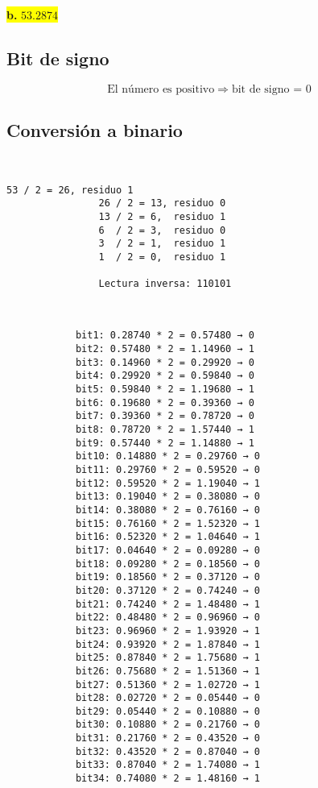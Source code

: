 \documentclass[a4paper,12pt]{article}
\begin{document}
	\begin{center}	
		\colorbox{yellow}{{\textbf{b.} $53.2874$}}
		
		\subsection*{Bit de signo}
		
		\[
		\text{El número es positivo} \Rightarrow \text{bit de signo = } \boxed{0}
		\]
		
		\subsection*{Conversión a binario}
				~~~~~~~
		\begin{center}
			\begin{Verbatim}[formatcom=\centering]
				53 / 2 = 26, residuo 1
				26 / 2 = 13, residuo 0
				13 / 2 = 6,  residuo 1
				6  / 2 = 3,  residuo 0
				3  / 2 = 1,  residuo 1
				1  / 2 = 0,  residuo 1
				
				Lectura inversa: 110101
			\end{Verbatim}
		\end{center}
 
		
		~~~~~~~~~
		
		\begin{center}
			\begin{Verbatim}
			bit1: 0.28740 * 2 = 0.57480 → 0 
			bit2: 0.57480 * 2 = 1.14960 → 1 
			bit3: 0.14960 * 2 = 0.29920 → 0 
			bit4: 0.29920 * 2 = 0.59840 → 0 
			bit5: 0.59840 * 2 = 1.19680 → 1 
			bit6: 0.19680 * 2 = 0.39360 → 0 
			bit7: 0.39360 * 2 = 0.78720 → 0 
			bit8: 0.78720 * 2 = 1.57440 → 1 
			bit9: 0.57440 * 2 = 1.14880 → 1 
			bit10: 0.14880 * 2 = 0.29760 → 0 
			bit11: 0.29760 * 2 = 0.59520 → 0 
			bit12: 0.59520 * 2 = 1.19040 → 1 
			bit13: 0.19040 * 2 = 0.38080 → 0 
			bit14: 0.38080 * 2 = 0.76160 → 0 
			bit15: 0.76160 * 2 = 1.52320 → 1 
			bit16: 0.52320 * 2 = 1.04640 → 1 
			bit17: 0.04640 * 2 = 0.09280 → 0 
			bit18: 0.09280 * 2 = 0.18560 → 0 
			bit19: 0.18560 * 2 = 0.37120 → 0 
			bit20: 0.37120 * 2 = 0.74240 → 0 
			bit21: 0.74240 * 2 = 1.48480 → 1 
			bit22: 0.48480 * 2 = 0.96960 → 0 
			bit23: 0.96960 * 2 = 1.93920 → 1 
			bit24: 0.93920 * 2 = 1.87840 → 1 
			bit25: 0.87840 * 2 = 1.75680 → 1 
			bit26: 0.75680 * 2 = 1.51360 → 1 
			bit27: 0.51360 * 2 = 1.02720 → 1 
			bit28: 0.02720 * 2 = 0.05440 → 0 
			bit29: 0.05440 * 2 = 0.10880 → 0 
			bit30: 0.10880 * 2 = 0.21760 → 0 
			bit31: 0.21760 * 2 = 0.43520 → 0 
			bit32: 0.43520 * 2 = 0.87040 → 0 
			bit33: 0.87040 * 2 = 1.74080 → 1 
			bit34: 0.74080 * 2 = 1.48160 → 1 	
			\end{Verbatim}
		\end{center}
		

\end{center}
\end{document}
